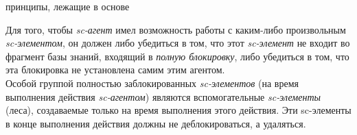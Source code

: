 \begin{SCn}
\begin{scnsubstruct}
\begin{scnrelfromlist}{принципы, лежащие в основе}
{\begin{scnenumerate}
        \end{scnenumerate}
        Для того, чтобы \textit{sc-агент} имел возможность работы с каким-либо произвольным \textit{sc-элементом}, он должен либо убедиться в том, что этот \textit{sc-элемент} не входит во фрагмент базы знаний, входящий в \textit{полную блокировку}, либо убедиться в том, что эта блокировка не установлена самим этим агентом.\\
        Особой группой полностью заблокированных \textit{sc-элементов} (на время выполнения действия \textit{\mbox{sc-агентом}}) являются вспомогательные \textit{sc-элементы} (леса), создаваемые только на время выполнения этого действия. Эти sc-элементы в конце выполнения действия должны не деблокироваться, а удаляться.}
\end{scnrelfromlist}

\begin{scnsubstruct}
    

\end{scnsubstruct}
\end{scnsubstruct}
\end{SCn}
